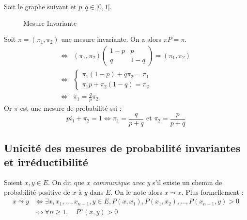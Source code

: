 \begin{example}
    Soit le graphe suivant et $ p,q \in ]0,1[$. 
    \begin{figure}[h!]
        \centering
        \caption{Mesure Invariante}
    \end{figure}
    Soit $ \pi = ( \pi_1, \pi_2)$ une mesure invariante. On a alors $ \pi P = \pi$. 
        \begin{align*}
            \iff & ( \pi_1, \pi_2) 
                \begin{pmatrix}
                    1-p & p \\ 
                    q & 1-q 
                \end{pmatrix} 
                = ( \pi_1, \pi_2) \\ 
            \iff & 
                \begin{cases}
                    \pi_1 (1-p) + q \pi_2 = \pi_1 \\ 
                    \pi_1 p + \pi_2(1-q) = \pi_2 
                \end{cases}\\ 
            \iff & 
                \pi_1 = \frac{q}{p} \pi_2 
        \end{align*}
        Or $ \pi$ est une mesure de probabilité ssi : 
            $$ pi_1 + \pi_2 = 1 \iff \pi_1 = \frac{q}{p+q} \text{ et } \pi_2 = \frac{p}{p+q} $$  
\end{example}

\subsection{Unicité des mesures de probabilité invariantes et irréductibilité}

\begin{definition}[Communication]
    Soient $x,y \in E$. On dit que \emph{$x$ communique avec $y$} s'il existe un chemin de probabilité positive 
    de $x$ à $y$ dans $E$. On le note alors $ x \leadsto x$. Plus formellement :
        \begin{align*}
            x \leadsto y & \iff \exists x, x_1, \dots, x_{n-1}, y \in E, P(x, x_1), P(x_1, x_2), \dots, P(x_{n-1}, y) > 0 \\ 
            & \iff \forall n \geqslant 1, \quad P^n(x,y) > 0 
        \end{align*}
\end{definition}

